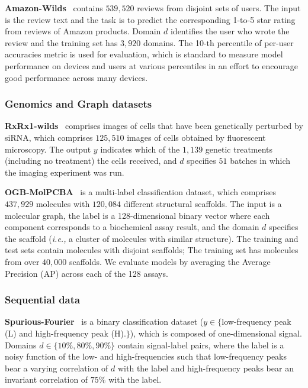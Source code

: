 \documentclass{article} \usepackage{iclr2023_conference,times}
\newcommand{\ie}[0]{\textit{i.e., }}
\begin{document}
\noindent \textbf{Amazon-Wilds}~\citep{koh2021wilds} contains $539,520$ reviews from disjoint sets of users. The input is the review text and the task is to predict the corresponding 1-to-5 star rating from reviews of Amazon products. Domain $d$ identifies the user who wrote the review and the training set has $3,920$ domains. The 10-th percentile of per-user accuracies metric is used for evaluation, which is standard to measure model performance on devices and users at various percentiles in an effort to encourage good performance across many devices.
 
\subsubsection{Genomics and Graph datasets}


\noindent\textbf{RxRx1-wilds}~\citep{koh2021wilds} comprises images of cells that have been genetically perturbed by siRNA, which comprises $125,510$ images of cells obtained by fluorescent microscopy. The output $y$ indicates which of the $1,139$ genetic treatments (including no treatment) the cells received, and $d$ specifies $51$ batches in which the imaging experiment was run.

\noindent\textbf{OGB-MolPCBA}~\citep{koh2021wilds} is a multi-label classification dataset, which comprises $437,929$ molecules with $120,084$ different structural scaffolds. The input is a molecular graph, the label is a 128-dimensional binary vector where each component corresponds to a biochemical assay result, and the domain $d$ specifies the scaffold (\ie a cluster of molecules with similar structure). The training and test sets contain molecules with disjoint scaffolds; The training set has molecules from over $40,000$ scaffolds. We evaluate models by averaging the Average Precision (AP) across each of the 128 assays.

\subsubsection{Sequential data}

\noindent\textbf{Spurious-Fourier}~\citep{gagnon2022woods} is a binary classification dataset ($y\in\{$low-frequency peak (L) and high-frequency peak (H).$\}$), which is composed of one-dimensional signal. Domains $d\in\{10\%,80\%,90\%\}$ contain signal-label pairs, where the label is a noisy function of the low- and high-frequencies such that low-frequency peaks bear a varying correlation of $d$ with the label and high-frequency peaks bear an invariant correlation of $75\%$ with the label.
\end{document}
